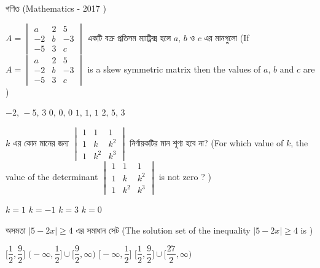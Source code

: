 \documentclass[addpoints]{exam}
\begin{document}
\begin{LARGE}
\begin{center}
গণিত (Mathematics - 2017 )
\end{center}
\end{LARGE}
\begin{questions}

\question $ A=\begin{vmatrix}
a & 2 & 5 \\
-2 & b & -3 \\
-5 & 3 & c
\end{vmatrix} $  একটি বক্র প্রতিসম ম্যাট্রিক্স হলে $ a,\,b $ ও $ c $ এর মানগুলো (If $ A=\begin{vmatrix}
a & 2 & 5 \\
-2 & b & -3 \\
-5 & 3 & c
\end{vmatrix} $ is a skew symmetric matrix then the values of $ a,\,b $ and $ c $ are )

\begin{oneparchoices}
\choice  $-2,\, -5,\, 3$
\choice  $0,\, 0,\, 0$
\choice  $1,\, 1,\, 1$
\choice  $2,\, 5,\, 3$

\end{oneparchoices}

\question  $ k $ এর কোন মানের জন্য $ \begin{vmatrix}
1 & 1 & 1 \\
1 & k & k^2 \\
1 & k^2 & k^3
\end{vmatrix}  $ নির্ণায়কটির মান শূণ্য হবে না? (For which value of $ k $, the value of the  determinant $ \begin{vmatrix}
1 & 1 & 1 \\
1 & k & k^2 \\
1 & k^2 & k^3
\end{vmatrix}  $ is not zero ? )

\begin{oneparchoices}
\choice $ k=1 $
\choice $ k=-1 $
\choice $ k=3 $
\choice  $ k=0 $

\end{oneparchoices}
    

\question   অসমতা $ |5-2x|\ge 4 $ এর সমাধান সেট (The solution set of the  inequality $ |5-2x|\ge 4 $ is )

\begin{oneparchoices}
\choice $ \Big[ \dfrac{1}{2}, \dfrac{9}{2} \Big] $
\choice $ \Big(-\infty, \dfrac{1}{2} \Big] \cup \Big[\dfrac{9}{2}, \infty \Big)$ 
\choice $ \Big[ -\infty, \dfrac{1}{2} \Big] $
\choice  $ \Big[ \dfrac{1}{2}, \dfrac{9}{2} \Big]\cup \Big[ \dfrac{27}{2}, \infty \Big) $


\end{oneparchoices}
\end{questions}
\end{document}
